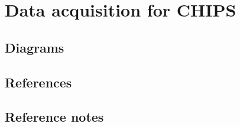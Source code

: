 \chapter{Data acquisition for CHIPS}
\label{chap:daq}




\section{Diagrams}


\section{References}


\section{Reference notes}